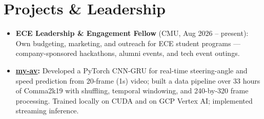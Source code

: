 \documentclass[11pt, letterpaper]{article}
\begin{document}
\section{Projects \& Leadership}
\begin{itemize}
  \item \textbf{ECE Leadership \& Engagement Fellow} (CMU, Aug 2026 -- present): Own budgeting, marketing, and outreach for ECE student programs --- company-sponsored hackathons, alumni events, and tech event outings.
  \item \textbf{\href{https://github.com/lordphone/my-av}{my-av}:} Developed a PyTorch CNN-GRU for real-time steering-angle and speed prediction from 20-frame (1s) video; built a data pipeline over 33 hours of Comma2k19 with shuffling, temporal windowing, and 240-by-320 frame processing. Trained locally on CUDA and on GCP Vertex AI; implemented streaming inference.
\end{itemize}
\end{document}
